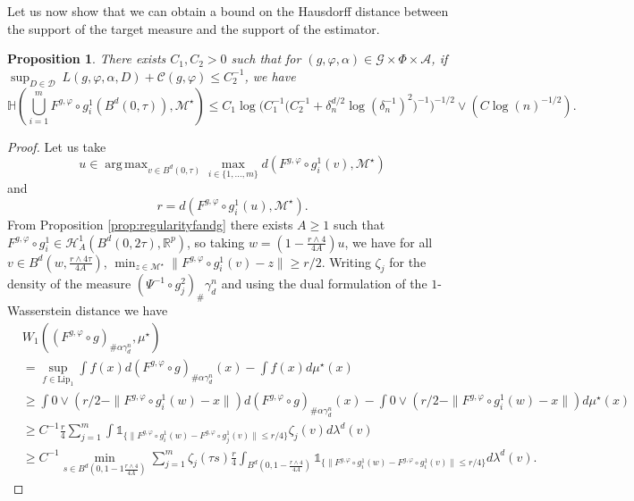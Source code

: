 \documentclass[10pt]{article}
\newtheorem{proposition}{Proposition}
\DeclareMathOperator*{\argmax}{arg\,max}
\begin{document}
Let us now show that we can obtain a bound on the Hausdorff distance between the support of the target measure and the support of the estimator.

\begin{proposition}\label{prop:distanceofthees}
There exists $C_1,C_2>0$ such that for $(g,\varphi,\alpha)\in \mathcal{G}\times  \Phi\times \mathcal{A}$, if $\sup_{D\in \mathcal{D}} \ L(g,\varphi,\alpha,D)+\mathcal{C}(g,\varphi)\leq C_2^{-1}$, we have
$$\mathbb{H}\left(\bigcup_{i=1}^m F^{g,\varphi}\circ g_i^1(B^d(0,\tau)),\mathcal{M}^\star\right)\leq C_1\log\Big(C_1^{-1}\Big(C_2^{-1}+\delta_n^{d/2}\log(\delta_n^{-1})^2\Big)^{-1}\Big)^{-1/2}\vee (C\log(n)^{-1/2}).$$
\end{proposition}

\begin{proof}
Let us take
$$u \in \argmax_{v\in B^d(0,\tau)} \max_{i\in \{1,...,m\}}d(F^{g,\varphi}\circ g_i^1(v),\mathcal{M}^\star)$$
and 
$$r=d(F^{g,\varphi}\circ g_i^1(u),\mathcal{M}^\star).$$
From Proposition \ref{prop:regularityfandg} there exists $A\geq 1$ such that $F^{g,\varphi} \circ g_i^1\in \mathcal{H}^{1}_{A}(B^d(0,2\tau),\mathbb{R}^p)$, so taking $w=(1-\frac{r\wedge 4}{4A})u$, we have for all $v\in B^d(w,\frac{r\wedge 4\tau}{4A})$, $\min_{z\in \mathcal{M}^\star} \|F^{g,\varphi}\circ g_i^1(v)-z\|\geq r/2$. Writing $\zeta_j$ for the density of the measure $(\Psi^{-1}\circ g_j^2)_{\#} \gamma_d^n$ and using the dual formulation of the $1$-Wasserstein distance we have 
\begin{align}\label{align:jdhdfgfizpodf}
    &W_1((F^{g,\varphi}\circ g)_{\# \alpha \gamma_d^n},\mu^\star) \nonumber \\
    & =\sup_{f\in \text{Lip}_1}\int f(x)d(F^{g,\varphi}\circ g)_{\# \alpha \gamma_d^n}(x)-\int f(x)d\mu^\star(x)\nonumber\\
    & \geq \int 0\vee (r/2-\|F^{g,\varphi} \circ g_i^1(w)-x\|)d(F^{g,\varphi}\circ g)_{\# \alpha \gamma_d^n}(x)-\int 0\vee (r/2-\|F^{g,\varphi} \circ g_i^1(w)-x\|)d\mu^\star(x)\nonumber\\
    & \geq C^{-1} \frac{r}{4}\sum_{j=1}^m\int \mathds{1}_{\{\|F^{g,\varphi} \circ g_i^1(w)-F^{g,\varphi}\circ g_j^1(v)\|\leq r/4\}}\zeta_j(v)d\lambda^d(v)\nonumber\\
    & \geq C^{-1}\min_{s\in B^d(0,1-1\frac{r\wedge 4}{4A})}\sum_{j=1}^m\zeta_j(\tau s) \frac{r}{4}\int_{B^d(0,1-\frac{r\wedge 4}{4A})} \mathds{1}_{\{\|F^{g,\varphi} \circ g_i^1(w)-F^{g,\varphi}\circ g_i^1(v)\|\leq r/4\}}d\lambda^d(v).
\end{align}

\end{proof}
\end{document}
